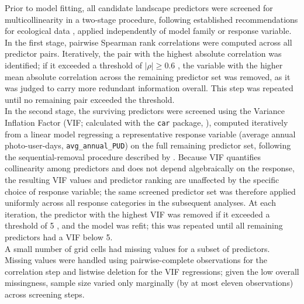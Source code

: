 \documentclass[hidelinks, 11pt]{article}
\begin{document}
Prior to model fitting, all candidate landscape predictors were screened
for multicollinearity in a two-stage procedure, following established
recommendations for ecological data \citep{zuur2010,dormann2012},
applied independently of model family or response variable.
\\
In the first stage, pairwise Spearman rank correlations were computed
across all predictor pairs. Iteratively, the pair with the highest
absolute correlation was identified; if it exceeded a threshold of
$|\rho| \geq 0.6$ \citep{vaz_digital_2020}, the variable with the higher mean
absolute correlation across the remaining predictor set was removed, as
it was judged to carry more redundant information overall. This step was
repeated until no remaining pair exceeded the threshold.
\\
In the second stage, the surviving predictors were screened using the
Variance Inflation Factor (VIF; calculated with the \texttt{car} package, \citealp{fox2018}), computed iteratively from a linear model regressing a representative response variable (average annual photo-user-days, \texttt{avg\_annual\_PUD}) on the full remaining predictor set, following the sequential-removal procedure described by \citet{zuur2010}. Because VIF quantifies collinearity among predictors and does not depend algebraically on the response, the resulting VIF values and predictor ranking are unaffected by the specific choice of response variable; the same screened predictor set was therefore applied uniformly across all response categories in the subsequent analyses. At each iteration, the predictor with the highest VIF was removed if it exceeded a threshold of 5 \citep{vaz_digital_2020}, and the model was refit; this was repeated until all remaining predictors had a VIF below 5.
\\
A small number of grid cells had missing values for a subset of predictors. Missing values were handled using pairwise-complete observations for the correlation step and listwise deletion for the VIF regressions; given the low overall missingness, sample size varied only marginally (by at most eleven observations) across screening steps.

\clearpage

\clearpage


\end{document}
